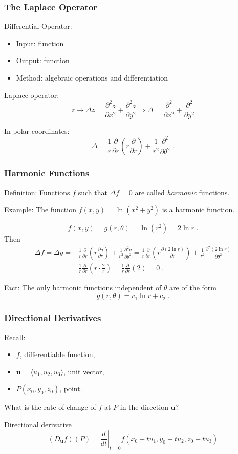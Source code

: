 \begin{frame}
  \frametitle{The Laplace Operator}
Differential Operator:
\begin{itemize}
  \item Input: function
  \item Output: function
  \item Method: algebraic operations and differentiation
\end{itemize}

\pause
Laplace operator:
%
$$z \to \Delta z = \frac{\partial^2 z}{\partial x^2} +\frac{\partial^2 z}{\partial y^2} \Longrightarrow \Delta = \frac{\partial^2 }{\partial x^2} +\frac{\partial^2 }{\partial y^2}$$

\pause
In polar coordinates:
%
$$\Delta = \frac{1}{r}\frac{\partial}{\partial r} \left( r\frac{\partial }{\partial r} \right) +  \frac{1}{r^2}\frac{\partial^2 }{\partial \theta^2}\; .$$
\end{frame}

\begin{frame}
  \frametitle{Harmonic Functions}

\underline{Definition}: Functions $f$ such that $\Delta f=0$ are called \emph{harmonic} functions.
\pause
\smallskip

\underline{Example:} The function $f(x,y) = \ln{(x^2+y^2)}$ is a harmonic function.
\pause

%
$$f(x,y) = g(r,\theta) = \ln{(r^2)} = 2\ln r \; .$$
%
Then
%
\begin{align*}
  \Delta f = \Delta g = & \frac{1}{r}\frac{\partial }{\partial r} \left( r\frac{\partial g }{\partial r} \right) +  \frac{1}{r^2}\frac{\partial^2 g}{\partial \theta^2} = \frac{1}{r}\frac{\partial }{\partial r} \left( r\frac{\partial (2\ln{r}) }{\partial r} \right) +  \frac{1}{r^2}\frac{\partial^2 (2\ln{r})}{\partial \theta^2} \\
  = & \frac{1}{r}\frac{\partial }{\partial r} \left( r \cdot \frac{2}{r} \right) = \frac{1}{r}\frac{\partial }{\partial r} (2) = 0\; .
\end{align*}

\pause
\underline{Fact}: The only harmonic functions independent of $\theta$ are of the form
%
$$g(r,\theta) = c_1\ln{r}+c_2 \; .$$
\end{frame}

\begin{frame}
  \frametitle{Directional Derivatives}

Recall:
\begin{itemize}
  \item $f$, differentiable function,
  \item $\textbf{u}=\langle u_1,u_2,u_3 \rangle$, unit vector,
  \item $P(x_0,y_0,z_0)$, point.
\end{itemize}
%
What is the rate of change of $f$ at $P$ in the direction $\textbf{u}$?

\pause
Directional derivative
%
$$(D_{\bm{u}}f)(P) = \left. \frac{d}{dt}\right|_{t=0} f(x_0+tu_1, y_0+tu_2,z_0+tu_3)$$  \end{frame}

